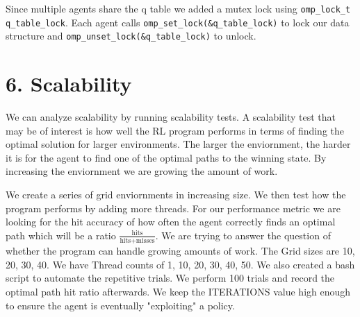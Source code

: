 \documentclass[12pt]{article}
\begin{document}
Since multiple agents share the q table we added a mutex lock
using \verb|omp_lock_t q_table_lock|. Each agent calls
\verb|omp_set_lock(&q_table_lock)| to lock our data structure
and \verb|omp_unset_lock(&q_table_lock)| to unlock.


\section*{6. Scalability}

We can analyze scalability by running scalability tests.
A scalability test that may be of interest is how
well the RL program performs in terms of finding the optimal 
solution for larger environments. The larger the enviornment, the harder it 
is for the agent to find one of the optimal paths to the winning state.
By increasing the enviornment we are growing the amount of work.

We create a series of grid enviornments in increasing size. We then
test how the program performs by adding more threads. 
For our performance metric we are looking for the hit 
accuracy of how often the agent correctly finds an optimal path
which will be a ratio $\frac{\text{hits}}{\text{hits+misses}}$.
We are trying to answer the question of whether the program
can handle growing amounts of work. The Grid sizes are 
10, 20, 30, 40. We have Thread counts of 1, 10, 20, 30, 40, 50.
We also created a bash script to automate
the repetitive trials. We perform 100 trials and record the
optimal path hit ratio afterwards. We keep the ITERATIONS
value high enough to ensure the agent is eventually "exploiting" a policy.
\end{document}
